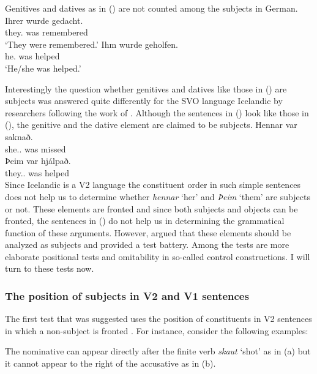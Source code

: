Genitives and datives as in () are not counted among the subjects in German.
\eal
\ex 
\gll Ihrer wurde gedacht.\\
     they.\GEN{} was remembered\\\german
\glt `They were remembered.'
\ex 
\gll Ihm       wurde geholfen.\\
     he.\DAT{} was   helped\\
\glt `He/she was helped.'
\zl

Interestingly the question whether genitives and datives like those in () are subjects was
answered quite differently for the SVO language Icelandic by researchers following the work of
\citet*{ZMT85a}. Although the sentences in () look like those in (), the genitive and
the dative element are claimed to be subjects.
\eal
\label{ex-subject-icelandic-passive-v2}
\ex 
\gll Hennar var saknað.\\
     she.\SG.\GEN{} was missed\\\icelandic
\ex 
\gll Þeim            var hjálpað.\\
     they.\PL.\DAT{} was helped\\
\zl
Since Icelandic is a V2 language the constituent order in such simple sentences does not help us to
determine whether \emph{hennar} `her' and \emph{Þeim} `them' are subjects or not. These elements are
fronted and since both subjects and objects can be fronted, the sentences in () do not help
us in determining the grammatical function of these arguments. However, \citet*{ZMT85a} argued that
these elements should be analyzed as subjects and provided a test battery. Among the tests are more
elaborate positional tests and omitability in so-called control constructions. I will turn to these
tests now.


\subsubsection{The position of subjects in V2 and V1 sentences}


The first test that was suggested uses the position of constituents in V2 sentences in which a
non-subject is fronted \citep*[Section~2.3]{ZMT85a}. For instance, consider the following examples:

\eal
\zl
The nominative can appear directly after the finite verb \emph{skaut} `shot' as in (a) but it
cannot appear to the right of the accusative as in (b).

